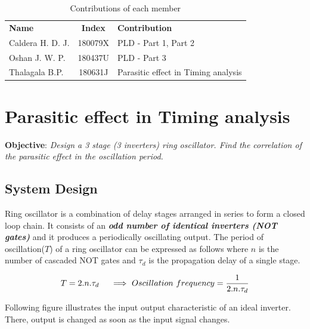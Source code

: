 \documentclass[a4paper,11pt]{article}%
\begin{document}


\tableofcontents
\vspace{4cm}
\begin{table}[H]
		\centering
		\begin{tabular}{l c l}
		\textbf{Name} & \textbf{Index} & \textbf{Contribution}\\

	Caldera H. D. J. &  180079X& PLD - Part 1, Part 2\\
	Oshan J. W. P.    & 180437U& PLD - Part 3 \\
	Thalagala B.P. & 180631J & Parasitic effect in Timing analysis \\ 


		\end{tabular}
		\caption{Contributions of each member}
\end{table}




\pagebreak
\section{Parasitic effect in Timing analysis}
\textbf{Objective}: \textit{Design a 3 stage (3 inverters) ring oscillator. Find the correlation of the parasitic effect in the oscillation period.}\\

\subsection{System Design}
Ring oscillator is a combination of delay stages arranged in series to form a closed loop chain. It consists of an \textbf{\textit{odd number of identical inverters (NOT gates)}} and it produces a  periodically oscillating output. The period of oscillation($T$) of a ring oscillator can be expressed as follows where $n$ is the number of cascaded NOT gates and $\tau_{d}$ is the propagation delay of a single stage.

\[
T = 2.n.\tau_{d} \hspace{5mm}\Longrightarrow ~ Oscillation~frequency = \frac{1}{2.n.\tau_{d}}
\]
\vspace{5mm}

Following figure illustrates the input output characteristic of an ideal inverter. There, output is changed as soon as the input signal changes.
\end{document}

